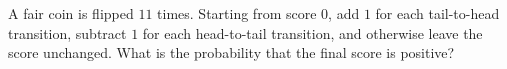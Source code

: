 A fair coin is flipped $11$ times. Starting from score $0$, add $1$ for each tail-to-head transition, subtract $1$ for each head-to-tail transition, and otherwise leave the score unchanged. What is the probability that the final score is positive?
